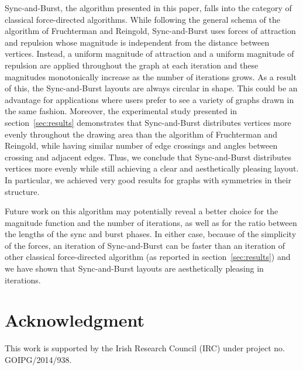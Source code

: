 \documentclass{llncs}
\begin{document}
Sync-and-Burst, the algorithm presented in this paper, falls into the category of classical force-directed algorithms. While following the general schema of the algorithm of Fruchterman and Reingold, Sync-and-Burst uses forces of attraction and repulsion whose magnitude is independent from the distance between vertices. Instead, a uniform magnitude of attraction and a uniform magnitude of repulsion are applied throughout the graph at each iteration and these magnitudes monotonically increase as the number of iterations grows. As a result of this, the Sync-and-Burst layouts are always circular in shape. This could be an advantage for applications where users prefer to see a variety of graphs drawn in the same fashion. Moreover, the experimental study presented in section~\ref{sec:results} demonstrates that Sync-and-Burst distributes vertices more evenly throughout the drawing area than the algorithm of Fruchterman and Reingold, while having similar number of edge crossings and angles between crossing and adjacent edges. Thus, we conclude that Sync-and-Burst distributes vertices more evenly while still achieving a clear and aesthetically pleasing layout. In particular, we achieved very good results for graphs with symmetries in their structure. 

Future work on this algorithm may potentially reveal a better choice for the magnitude function  and the number of iterations, as well as for the ratio between the lengths of the sync and burst phases. In either case, because of the simplicity of the forces, an iteration of Sync-and-Burst can be faster than an iteration of other classical force-directed algorithm (as reported in section~\ref{sec:results}) and we have shown that Sync-and-Burst layouts are aesthetically pleasing in  iterations. 

\section*{Acknowledgment}

This work is supported by the Irish Research Council (IRC) under project no. GOIPG/2014/938.



\end{document}
